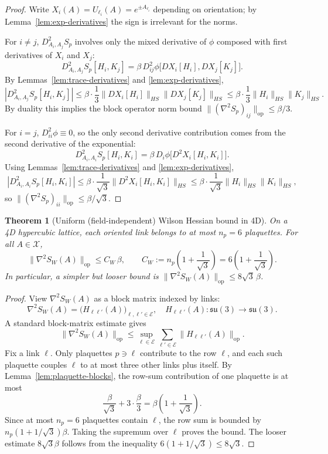 \documentclass[11pt]{article}
\newtheorem{theorem}{Theorem}
\begin{document}
\begin{proof}
Write $X_i(A)=U_{\ell_i}(A)=e^{\pm A_{\ell_i}}$ depending on orientation; by Lemma~\ref{lem:exp-derivatives} the sign is irrelevant for the norms.

For $i\neq j$, $D^2_{A_i,A_j}S_p$ involves only the mixed derivative of $\phi$ composed with first derivatives of $X_i$ and $X_j$:
\[
D^2_{A_i,A_j}S_p[H_i,K_j]
=
\beta\,D^2_{ij}\phi\big[DX_i[H_i],DX_j[K_j]\big].
\]
By Lemmas~\ref{lem:trace-derivatives} and \ref{lem:exp-derivatives},
\[
|D^2_{A_i,A_j}S_p[H_i,K_j]|
\le \beta\cdot \frac{1}{3}\|DX_i[H_i]\|_{HS}\|DX_j[K_j]\|_{HS}
\le \beta\cdot \frac{1}{3}\|H_i\|_{HS}\|K_j\|_{HS}.
\]
By duality this implies the block operator norm bound $\|(\nabla^2 S_p)_{ij}\|_{\mathrm{op}}\le \beta/3$.

For $i=j$, $D^2_{ii}\phi\equiv 0$, so the only second derivative contribution comes from the second derivative of the exponential:
\[
D^2_{A_i,A_i}S_p[H_i,K_i]
=
\beta\,D_i\phi\big[D^2X_i[H_i,K_i]\big].
\]
Using Lemmas~\ref{lem:trace-derivatives} and \ref{lem:exp-derivatives},
\[
|D^2_{A_i,A_i}S_p[H_i,K_i]|
\le \beta\cdot\frac{1}{\sqrt{3}}\|D^2X_i[H_i,K_i]\|_{HS}
\le \beta\cdot\frac{1}{\sqrt{3}}\|H_i\|_{HS}\|K_i\|_{HS},
\]
so $\|(\nabla^2 S_p)_{ii}\|_{\mathrm{op}}\le \beta/\sqrt{3}$.
\end{proof}

\begin{theorem}[Uniform (field-independent) Wilson Hessian bound in 4D]
\label{thm:uniform-wilson-hessian}
On a 4D hypercubic lattice, each oriented link belongs to at most $n_p=6$ plaquettes.
For all $A\in\mathcal{X}$,
\[
\boxed{
\|\nabla^2 S_W(A)\|_{\mathrm{op}}
\le
C_W\,\beta,
\qquad
C_W := n_p\left(1+\frac{1}{\sqrt{3}}\right)=6\left(1+\frac{1}{\sqrt{3}}\right).
}
\]
In particular, a simpler but looser bound is $\|\nabla^2 S_W(A)\|_{\mathrm{op}}\le 8\sqrt{3}\,\beta$.
\end{theorem}

\begin{proof}
View $\nabla^2 S_W(A)$ as a block matrix indexed by links:
\[
\nabla^2 S_W(A) = \big(H_{\ell\ell'}(A)\big)_{\ell,\ell'\in\mathcal{E}},
\quad
H_{\ell\ell'}(A):\mathfrak{su}(3)\to\mathfrak{su}(3).
\]
A standard block-matrix estimate gives
\[
\|\nabla^2 S_W(A)\|_{\mathrm{op}}
\le \sup_{\ell\in\mathcal{E}} \sum_{\ell'\in\mathcal{E}} \|H_{\ell\ell'}(A)\|_{\mathrm{op}}.
\]
Fix a link $\ell$. Only plaquettes $p\ni \ell$ contribute to the row $\ell$, and each such plaquette couples $\ell$ to at most three other links plus itself. By Lemma~\ref{lem:plaquette-blocks}, the row-sum contribution of one plaquette is at most
\[
\frac{\beta}{\sqrt{3}} + 3\cdot \frac{\beta}{3} = \beta\left(1+\frac{1}{\sqrt{3}}\right).
\]
Since at most $n_p=6$ plaquettes contain $\ell$, the row sum is bounded by $n_p(1+1/\sqrt{3})\beta$. Taking the supremum over $\ell$ proves the bound.
The looser estimate $8\sqrt{3}\beta$ follows from the inequality $6(1+1/\sqrt{3})\le 8\sqrt{3}$.
\end{proof}
\end{document}

